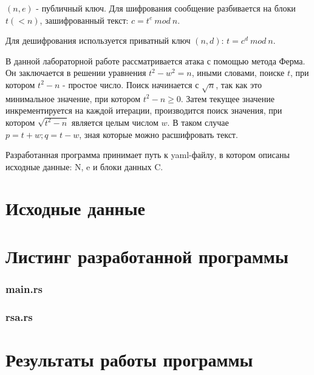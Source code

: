 \documentclass[12pt, a4paper]{article}
\begin{document}
$(n,e)$ - публичный ключ. Для шифрования сообщение разбивается на блоки $t (<n)$,
зашифрованный текст: $c = t^e\:mod\:n$.

Для дешифрования используется приватный ключ $(n,d)$: $t = c^d\:mod\:n$.

В данной лабораторной работе рассматривается атака с помощью метода Ферма. Он
заключается в решении уравнения $t^2 - w^2 = n$, иными словами, поиске $t$, при
котором $t^2 - n$ - простое число. Поиск начинается с $\sqrt{n}$, так как это
минимальное значение, при котором $t^2 - n \ge 0$. Затем текущее значение
инкрементируется на каждой итерации, производится поиск значения, при котором
$\sqrt{t^2 - n}$ является целым числом $w$. В таком случае\\$p = t + w; q = t - w$,
зная которые можно расшифровать текст.

Разработанная программа принимает путь к yaml-файлу, в котором описаны исходные
данные: N, e и блоки данных C.
\newpage
\section*{Исходные данные}



\section*{Листинг разработанной программы}

\subsubsection*{main.rs}



\subsubsection*{rsa.rs}



\section*{Результаты работы программы}
\end{document}

